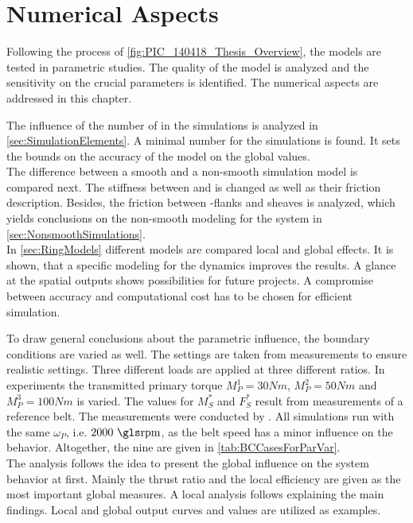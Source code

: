 \chapter{Numerical Aspects} \label{chap:NumericalAspects}

Following the process of \cref{fig:PIC_140418_Thesis_Overview}, the models are tested in parametric studies.
The quality of the model is analyzed and the sensitivity on the crucial parameters is identified.
The numerical aspects are addressed in this chapter.\par
%
The influence of the number of \els in the simulations is analyzed in \cref{sec:SimulationElements}.
A minimal number for the simulations is found.
It sets the bounds on the accuracy of the model on the global values.\\
The difference between a smooth and a non-smooth simulation model is compared next.
The stiffness between \els and \rings is changed as well as their friction description.
Besides, the friction between \el-flanks and sheaves is analyzed, which yields conclusions on the non-smooth modeling for the system in \cref{sec:NonsmoothSimulations}.\\
In \cref{sec:RingModels} different \ring models are compared \wrt local and global effects.
It is shown, that a specific modeling for the \CVT dynamics improves the results.
A glance at the spatial outputs shows possibilities for future projects. 
A compromise between accuracy and computational cost has to be chosen for efficient simulation.\par

To draw general conclusions about the parametric influence, the boundary conditions are varied as well.
The settings are taken from measurements to ensure realistic settings.
Three different loads are applied at three different ratios.
In experiments the transmitted primary torque $M_P^1 = 30 \unit{Nm}$, $M_P^2 = 50 \unit{Nm}$ and $M_P^3 = 100 \unit{Nm}$ is varied.
The values for $M_S^*$ and $F_S^*$ result from measurements of a reference belt.
The measurements were conducted by \Bosch.
All simulations run with the same $\omega_P$, i.e. $2000\ \unit{\RPM}$, as the belt speed has a minor influence on the behavior.
Altogether, the nine \BCs are given in \cref{tab:BCCasesForParVar}.\\
The analysis follows the idea to present the global influence on the system behavior at first.
Mainly the thrust ratio \iF and the local efficiency \eff are given as the most important global measures.
A local analysis follows explaining the main findings.
Local and global output curves and values are utilized as examples.

